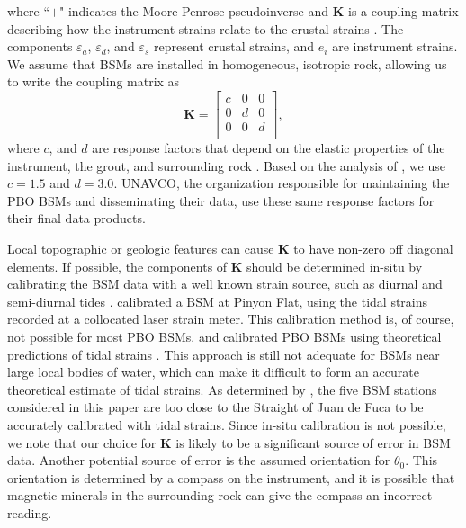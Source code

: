 \documentclass[10pt,a4paper]{article}
\begin{document}
where ``$+$" indicates the Moore-Penrose pseudoinverse and $\mathbf{K}$ is a coupling matrix describing how the instrument strains relate to the crustal strains \citep{Hart1996}. The components $\varepsilon_a$, $\varepsilon_d$, and $\varepsilon_s$ represent crustal strains, and $e_i$ are instrument strains. We assume that BSMs are installed in homogeneous, isotropic rock, allowing us to write the coupling matrix as
\begin{equation}\label{eq:CouplingMatrix}
\mathbf{K} = 
\left[\begin{array}{ccc}
c & 0 & 0 \\
0 & d & 0 \\
0 & 0 & d \\
\end{array}\right],
\end{equation}  
where $c$, and $d$ are response factors that depend on the elastic properties of the instrument, the grout, and surrounding rock \citep{Gladwin1985}. Based on the analysis of \citet{Gladwin1985}, we use $c=1.5$ and $d=3.0$. UNAVCO, the organization responsible for maintaining the PBO BSMs and disseminating their data, use these same response factors for their final data products. 

Local topographic or geologic features can cause $\mathbf{K}$ to have non-zero off diagonal elements. If possible, the components of $\mathbf{K}$ should be determined in-situ by calibrating the BSM data with a well known strain source, such as diurnal and semi-diurnal tides \citep{Hart1996,Roeloffs2010,Hodgkinson2013}. \citet{Hart1996} calibrated a BSM at Pinyon Flat, using the tidal strains recorded at a collocated laser strain meter. This calibration method is, of course, not possible for most PBO BSMs. \citet{Roeloffs2010} and \citet{Hodgkinson2013} calibrated PBO BSMs using theoretical predictions of tidal strains \citep[e.g.,][]{Agnew1997}. This approach is still not adequate for BSMs near large local bodies of water, which can make it difficult to form an accurate theoretical estimate of tidal strains. As determined by \citet{Roeloffs2010}, the five BSM stations considered in this paper are too close to the Straight of Juan de Fuca to be accurately calibrated with tidal strains. Since in-situ calibration is not possible, we note that our choice for $\mathbf{K}$ is likely to be a significant source of error in BSM data. Another potential source of error is the assumed orientation for $\theta_0$. This orientation is determined by a compass on the instrument, and it is possible that magnetic minerals in the surrounding rock can give the compass an incorrect reading. 
\end{document}
